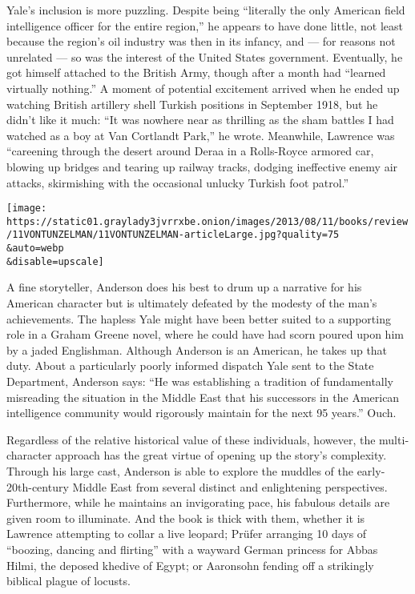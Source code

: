Yale's inclusion is more puzzling. Despite being ``literally the only
American field intelligence officer for the entire region,'' he appears
to have done little, not least because the region's oil industry was
then in its infancy, and --- for reasons not unrelated --- so was the
interest of the United States government. Eventually, he got himself
attached to the British Army, though after a month had ``learned
virtually nothing.'' A moment of potential excitement arrived when he
ended up watching British artillery shell Turkish positions in September
1918, but he didn't like it much: ``It was nowhere near as thrilling as
the sham battles I had watched as a boy at Van Cortlandt Park,'' he
wrote. Meanwhile, Lawrence was ``careening through the desert around
Deraa in a Rolls-Royce armored car, blowing up bridges and tearing up
railway tracks, dodging ineffective enemy air attacks, skirmishing with
the occasional unlucky Turkish foot patrol.''

\texttt{[image: https://static01.graylady3jvrrxbe.onion/images/2013/08/11/books/review/11VONTUNZELMAN/11VONTUNZELMAN-articleLarge.jpg?quality=75\\\&auto=webp\\\&disable=upscale]}

A fine storyteller, Anderson does his best to drum up a narrative for
his American character but is ultimately defeated by the modesty of the
man's achievements. The hapless Yale might have been better suited to a
supporting role in a Graham Greene novel, where he could have had scorn
poured upon him by a jaded Englishman. Although Anderson is an American,
he takes up that duty. About a particularly poorly informed dispatch
Yale sent to the State Department, Anderson says: ``He was establishing
a tradition of fundamentally misreading the situation in the Middle East
that his successors in the American intelligence community would
rigorously maintain for the next 95 years.'' Ouch.

Regardless of the relative historical value of these individuals,
however, the multi­character approach has the great virtue of opening up
the story's complexity. Through his large cast, Anderson is able to
explore the muddles of the early-20th-century Middle East from several
distinct and enlightening perspectives. Furthermore, while he maintains
an invigorating pace, his fabulous details are given room to illuminate.
And the book is thick with them, whether it is Lawrence attempting to
collar a live leopard; Prüfer arranging 10 days of ``boozing, dancing
and flirting'' with a wayward German princess for Abbas Hilmi, the
deposed khedive of Egypt; or Aaronsohn fending off a strikingly biblical
plague of locusts.

